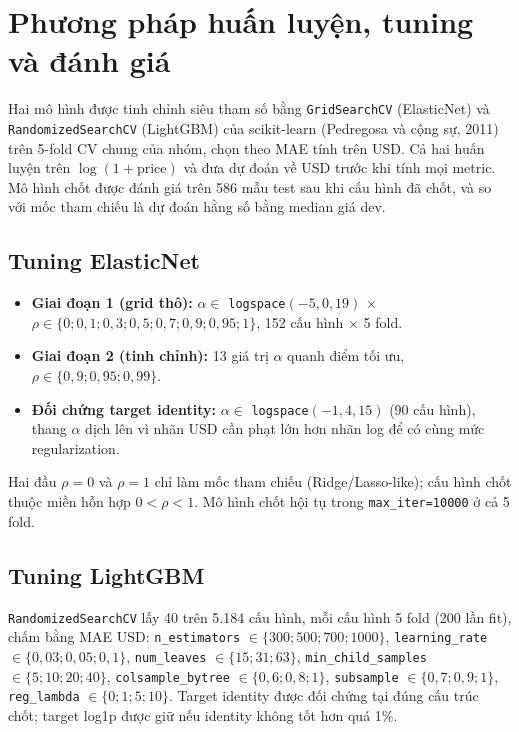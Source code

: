 \section{Phương pháp huấn luyện, tuning và đánh giá}
\label{sec:method-b}

Hai mô hình được tinh chỉnh siêu tham số bằng \texttt{GridSearchCV} (ElasticNet) và \texttt{RandomizedSearchCV}
(LightGBM) của scikit-learn (Pedregosa và cộng sự, 2011) trên 5-fold CV chung của nhóm, chọn theo MAE tính trên
USD. Cả hai huấn luyện trên $\log(1+\text{price})$ và đưa dự đoán về USD trước khi tính mọi metric. Mô hình chốt
được đánh giá trên 586 mẫu test sau khi cấu hình đã chốt, và so với mốc tham chiếu là dự đoán hằng số bằng median
giá dev.

\subsection{Tuning ElasticNet}

\begin{itemize}
  \item \textbf{Giai đoạn 1 (grid thô):} $\alpha\in$ \texttt{logspace}$(-5,0,19)$
    $\times$ $\rho\in\{0;0{,}1;0{,}3;0{,}5;0{,}7;0{,}9;0{,}95;1\}$, 152 cấu hình $\times$ 5 fold.
  \item \textbf{Giai đoạn 2 (tinh chỉnh):} 13 giá trị $\alpha$ quanh điểm tối ưu, $\rho\in\{0{,}9;0{,}95;0{,}99\}$.
  \item \textbf{Đối chứng target identity:} $\alpha\in$ \texttt{logspace}$(-1,4,15)$ (90 cấu hình), thang $\alpha$
    dịch lên vì nhãn USD cần phạt lớn hơn nhãn log để có cùng mức regularization.
\end{itemize}
Hai đầu $\rho=0$ và $\rho=1$ chỉ làm mốc tham chiếu (Ridge/Lasso-like); cấu hình chốt thuộc miền hỗn hợp
$0<\rho<1$. Mô hình chốt hội tụ trong \texttt{max\_iter=10000} ở cả 5 fold.

\subsection{Tuning LightGBM}

\texttt{RandomizedSearchCV} lấy 40 trên 5.184 cấu hình, mỗi cấu hình 5 fold (200 lần fit), chấm bằng MAE USD:
\texttt{n\_estimators} $\in\{300;500;700;1000\}$, \texttt{learning\_rate} $\in\{0{,}03;0{,}05;0{,}1\}$,
\texttt{num\_leaves} $\in\{15;31;63\}$, \texttt{min\_child\_samples} $\in\{5;10;20;40\}$,
\texttt{colsample\_bytree} $\in\{0{,}6;0{,}8;1\}$, \texttt{subsample} $\in\{0{,}7;0{,}9;1\}$,
\texttt{reg\_lambda} $\in\{0;1;5;10\}$. Target identity được đối chứng tại đúng cấu trúc chốt; target log1p được
giữ nếu identity không tốt hơn quá 1\%.

